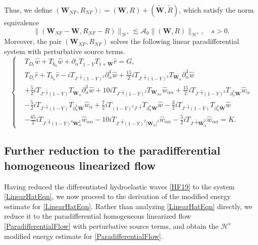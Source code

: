 \documentclass[10pt]{amsart}
\theoremstyle{remark}
\theoremstyle{definition}
\numberwithin{equation}{section}
\newcommand{\p}{\partial}
\renewcommand{\H}{{\mathcal H }}
\newcommand{\al}{\alpha}
\newcommand{\f}{\frac}
\newcommand{\bw}{\mathbf{W}}
\newcommand{\CalAZ}{{\mathcal{A}_0}}
\begin{document}
Thus, we define $(\bw_{NF}, R_{NF}): = (\bw, R)+(\tilde{\bw}, \tilde{R})$, which satisfy the norm equivalence
\begin{equation} \label{DiffNfBound}
    \|(\bw_{NF}-\bw , R_{NF}-R) \|_{\H^s} \lesssim \CalAZ \|(\bw, R)\|_{\H^s}, \quad s>0.
\end{equation}
Moreover, the pair $(\bw_{NF}, R_{NF})$ solves the following linear paradifferential system with perturbative source terms.
\begin{equation} \label{LinearHatEqn}
 \begin{cases}
&T_{D_t}\hat{w} + T_{b_\alpha}\hat{w} + \partial_\alpha T_{1-\bar{Y}}T_{1+\bw} \hat{r}  = G,\\
&T_{D_t}\hat{r} + T_{b_\alpha}\hat{r} -iT_{J^{-\f32}(1-Y)^2}\p^4_{\al}\hat{w}+\f{15}{2}iT_{J^{-\f32}(1-Y)^3}T_{\bw_{\al}}\p^{3}_{\al}\hat{w}\\
&+\f52iT_{J^{-\f52}(1-Y)}T_{\bar{\bw}_{\al}}\p^3_{\al}\hat{w}+10iT_{J^{-\f32}(1-Y)^3}T_{\bw_{\al\al}}\hat{w}_{\al\al}+\f{15}{2}iT_{J^{-\f32}(1-Y)^3}T_{\p^3_{\al}\bw}\hat{w}_{\al}\\
&-\f52 iT_{J^{-\f52}(1-Y)}T_{\p^3_{\al}\bar{\bw}}
\hat{w}_{\al} +\f72iT_{(1-Y)^3J^{-\f32}}T_{\p^4_{\al}\bw}\hat{w}- \f32i T_{J^{-\f52}(1-Y)}T_{\p^4_{\al}\bar{\bw}} \hat{w}\\
&-\f{65}{2}iT_{J^{-\f32}(1-Y)^4\bw_{\al}^2}\hat{w}_{\al\al}-10iT_{J^{-\f52}(1-Y)^2|\bw_{\al}|^2}\hat{w}_{\al\al}-\f{5}{2}iT_{J^{-\f72}\bar{\bw}_{\al}^2}\hat{w}_{\al\al} = K.
\end{cases}
\end{equation}

\subsection{Further reduction to the paradifferential homogeneous linearized flow} \label{s:ParaFlowReduct}
Having reduced the differentiated hydroelastic waves \eqref{HF19} to the system \eqref{LinearHatEqn}, we now proceed to the derivation of the modified energy estimate for \eqref{LinearHatEqn}.
Rather than analyzing  \eqref{LinearHatEqn} directly, we reduce it to the paradifferential homogeneous linearized flow \eqref{ParadifferentialFlow} with perturbative source terms, and obtain the $\H^s$ modified energy estimate for \eqref{ParadifferentialFlow}. 
\end{document}
